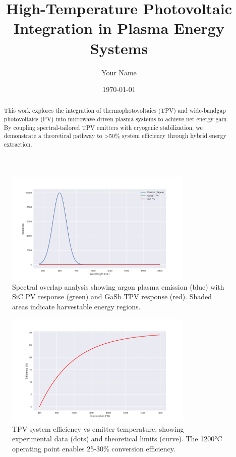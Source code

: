 \documentclass{article}
\title{High-Temperature Photovoltaic Integration in Plasma Energy Systems}
\author{Your Name}
\date{\today}
\begin{document}
\maketitle

\begin{abstract}
This work explores the integration of thermophotovoltaics (TPV) and wide-bandgap photovoltaics (PV) into microwave-driven plasma systems to achieve net energy gain. By coupling spectral-tailored TPV emitters with cryogenic stabilization, we demonstrate a theoretical pathway to >50\% system efficiency through hybrid energy extraction.
\end{abstract}

\begin{figure}[ht]
  \centering
  \includegraphics[width=0.8\textwidth]{spectra.png}
  \caption{Spectral overlap analysis showing argon plasma emission (blue) with SiC PV response (green) and GaSb TPV response (red). Shaded areas indicate harvestable energy regions.}
  \label{fig:spectra}
\end{figure}

\begin{figure}[ht]
  \centering
  \includegraphics[width=0.8\textwidth]{efficiency.png}
  \caption{TPV system efficiency vs emitter temperature, showing experimental data (dots) and theoretical limits (curve). The 1200°C operating point enables 25-30\% conversion efficiency.}
  \label{fig:efficiency}
\end{figure}
\end{document}
